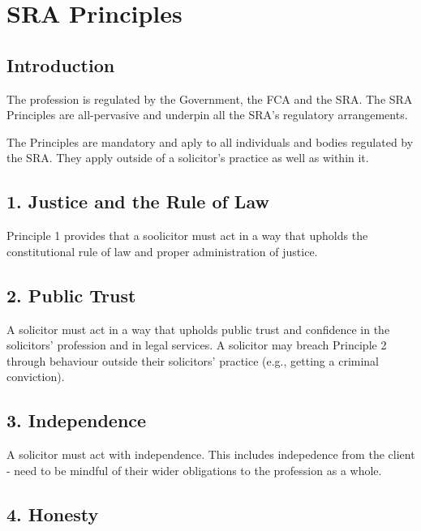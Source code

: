 \documentclass[
]{article}
\begin{document}
\hypertarget{sra-principles}{%
\section{SRA Principles}\label{sra-principles}}

\hypertarget{introduction}{%
\subsection{Introduction}\label{introduction}}

The profession is regulated by the Government, the FCA and the SRA. The
SRA Principles are all-pervasive and underpin all the SRA's regulatory
arrangements.

The Principles are mandatory and aply to all individuals and bodies
regulated by the SRA. They apply outside of a solicitor's practice as
well as within it.

\hypertarget{justice-and-the-rule-of-law}{%
\subsection{1. Justice and the Rule of
Law}\label{justice-and-the-rule-of-law}}

Principle 1 provides that a soolicitor must act in a way that upholds
the constitutional rule of law and proper administration of justice.

\hypertarget{public-trust}{%
\subsection{2. Public Trust}\label{public-trust}}

A solicitor must act in a way that upholds public trust and confidence
in the solicitors' profession and in legal services. A solicitor may
breach Principle 2 through behaviour outside their solicitors' practice
(e.g., getting a criminal conviction).

\hypertarget{independence}{%
\subsection{3. Independence}\label{independence}}

A solicitor must act with independence. This includes indepedence from
the client - need to be mindful of their wider obligations to the
profession as a whole.

\hypertarget{honesty}{%
\subsection{4. Honesty}\label{honesty}}
\end{document}

